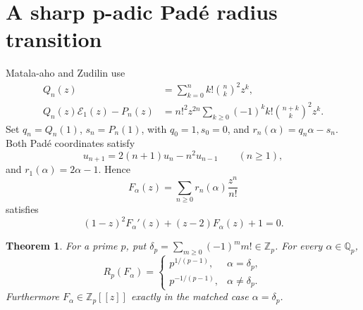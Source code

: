 \documentclass[11pt]{article}
\newtheorem{theorem}{Theorem}[section]
\theoremstyle{definition}
\theoremstyle{remark}
\newcommand{\Q}{\mathbb Q}
\newcommand{\Z}{\mathbb Z}
\newcommand{\Eul}{\mathcal E}
\begin{document}
\section{A sharp p-adic Pad\'e radius transition}

Matala-aho and Zudilin use \cite{MZ2018}
\begin{align*}
 Q_n(z)&=\sum_{k=0}^n k!\binom nk^2z^k,\\
 Q_n(z)\Eul_1(z)-P_n(z)&=
 n!^2z^{2n}\sum_{k\ge0}(-1)^kk!\binom{n+k}{k}^2z^k.
\end{align*}
Set \(q_n=Q_n(1)\), \(s_n=P_n(1)\), with \(q_0=1,s_0=0\), and
\(r_n(\alpha)=q_n\alpha-s_n\).  Both Pad\'e coordinates satisfy
\[
 u_{n+1}=2(n+1)u_n-n^2u_{n-1}\qquad(n\ge1),
\]
and \(r_1(\alpha)=2\alpha-1\).  Hence
\[
 F_\alpha(z)=\sum_{n\ge0}r_n(\alpha)\frac{z^n}{n!}
\]
satisfies
\begin{equation}\label{eq:pade-ode}
 (1-z)^2F_\alpha'(z)+(z-2)F_\alpha(z)+1=0.
\end{equation}

\begin{theorem}\label{thm:radius}
For a prime \(p\), put
\(\delta_p=\sum_{m\ge0}(-1)^mm!\in\Z_p\).  For every
\(\alpha\in\Q_p\),
\[
 R_p(F_\alpha)=
 \begin{cases}
 p^{1/(p-1)},&\alpha=\delta_p,\\
 p^{-1/(p-1)},&\alpha\ne\delta_p.
 \end{cases}
\]
Furthermore \(F_\alpha\in\Z_p[[z]]\) exactly in the matched case
\(\alpha=\delta_p\).
\end{theorem}
\end{document}

